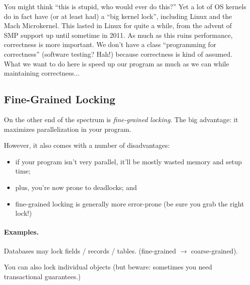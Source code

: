 You might think ``this is stupid, who would ever do this?'' Yet a lot of OS kernels do in fact have (or at least had) a ``big kernel lock'', including Linux and the Mach Microkernel. This lasted in Linux for quite a while, from the advent of SMP support up until sometime in 2011. As much as this ruins performance, correctness is more important. We don't have a class ``programming for correctness'' (software testing? Hah!) because correctness is kind of assumed. What we want to do here is speed up our program as much as we can while maintaining correctness...

\subsection*{Fine-Grained Locking}
On the other end of the spectrum is \emph{fine-grained locking}. The big
advantage: it maximizes parallelization in your program.

However, it also comes with a number of disadvantages:
  \begin{itemize}
    \item if your program isn't very parallel, it'll be mostly wasted memory and setup time;
    \item plus, you're now prone to deadlocks; and
    \item fine-grained locking is generally more error-prone (be sure you grab the right lock!)
  \end{itemize}

\paragraph{Examples.}

    Databases may lock fields / records / tables. (fine-grained $\rightarrow$ coarse-grained).

    You can also lock individual objects (but beware: sometimes you need transactional guarantees.)




